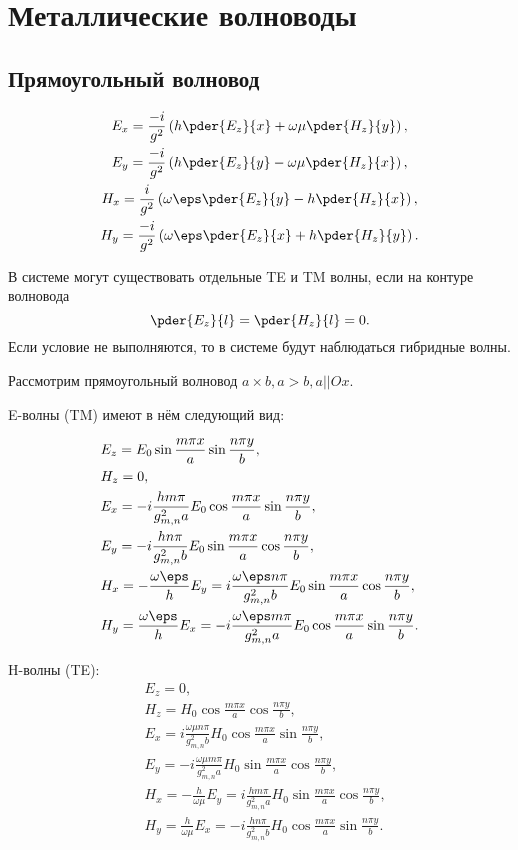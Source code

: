 \chapter{Металлические волноводы}
\section{Прямоугольный волновод}

\begin{gather*}
	E_x = \frac{-i}{g^2}\left(h\pder{E_z}{x} + \omega\mu\pder{H_z}{y}\right),\\
	E_y = \frac{-i}{g^2}\left(h\pder{E_z}{y} - \omega\mu\pder{H_z}{x}\right),\\
	H_x = \frac{i}{g^2}\left(\omega\eps\pder{E_z}{y} - h\pder{H_z}{x}\right),\\
	H_y = \frac{-i}{g^2}\left(\omega\eps\pder{E_z}{x} + h\pder{H_z}{y}\right).
\end{gather*}

В системе могут существовать отдельные TE и TM волны, если на контуре волновода
\[
	\pder{E_z}{l} = \pder{H_z}{l} = 0.
\]
Если условие не выполняются, то в системе будут наблюдаться гибридные волны.

Рассмотрим прямоугольный волновод \( a \times b, a > b, a || Ox \).

E-волны (TM) имеют в нём следующий вид:

\begin{align*}
	& E_z = E_0\sin\frac{m\pi x}{a}\sin\frac{n\pi y}{b},\\
	& H_z = 0,\\
	& E_x = -i\frac{hm\pi}{g_{m,n}^2a}E_0\cos\frac{m\pi x}{a}\sin\frac{n\pi y}{b},\\
	& E_y = -i\frac{hn\pi}{g_{m,n}^2b}E_0\sin\frac{m\pi x}{a}\cos\frac{n\pi y}{b},\\
	& H_x = -\frac{\omega\eps}{h}E_y = i\frac{\omega\eps n\pi}{g_{m,n}^2b}E_0
	 								\sin\frac{m\pi x}{a}\cos\frac{n\pi y}{b},\\
	& H_y = \frac{\omega\eps}{h}E_x = -i\frac{\omega\eps m\pi}{g_{m,n}^2a}E_0
	 								\cos\frac{m\pi x}{a}\sin\frac{n\pi y}{b}.
\end{align*}

H-волны (TE):
\begin{align*}
	& E_z = 0,\\
	& H_z = H_0\cos\frac{m\pi x}{a}\cos\frac{n\pi y}{b},\\
	& E_x = i\frac{\omega\mu n\pi}{g_{m,n}^2b}H_0\cos\frac{m\pi x}{a}\sin\frac{n\pi y}{b},\\
	& E_y = -i\frac{\omega\mu m\pi}{g_{m,n}^2a}H_0\sin\frac{m\pi x}{a}\cos\frac{n\pi y}{b},\\
	& H_x = -\frac{h}{\omega\mu}E_y = i\frac{hm\pi}{g_{m,n}^2a}H_0
	 								\sin\frac{m\pi x}{a}\cos\frac{n\pi y}{b},\\
	& H_y = \frac{h}{\omega\mu}E_x = -i\frac{h n\pi}{g_{m,n}^2b}H_0
	 								\cos\frac{m\pi x}{a}\sin\frac{n\pi y}{b}.
\end{align*}

